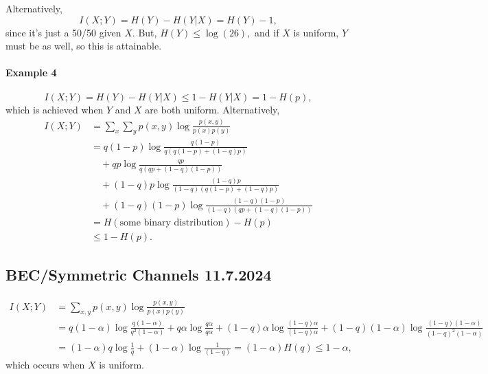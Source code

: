 \documentclass[12pt]{article}
\begin{document}
Alternatively,
\[I(X;Y)=H(Y)-H(Y|X)=H(Y)-1,\]
since it's just a 50/50 given $X.$ But, $H(Y)\le\log(26),$ and if $X$ is uniform, $Y$ must be as well, so this is attainable.

\bigskip
{}

\paragraph{Example 4}
\[I(X;Y)=H(Y)-H(Y|X)\le 1-H(Y|X)=1-H(p),\]
which is achieved when $Y$ and $X$ are both uniform.
Alternatively,
\begin{align*}I(X;Y)&=\sum_x\sum_y p(x,y)\log\frac{p(x,y)}{p(x)p(y)}\\&=q(1-p)\log\frac{q(1-p)}{q(q(1-p)+(1-q)p)}\\&\quad +qp\log\frac{qp}{q(qp+(1-q)(1-p))}\\&\quad +(1-q)p\log\frac{(1-q)p}{(1-q)(q(1-p)+(1-q)p)}\\&\quad +(1-q)(1-p)\log\frac{(1-q)(1-p)}{(1-q)(qp+(1-q)(1-p))}\\&=H(\text{some binary distribution})-H(p)\\&\le \boxed{1-H(p)}.\end{align*}



\subsection{BEC/Symmetric Channels 11.7.2024}


\begin{align*}I(X;Y)&=\sum_{x,y}p(x,y)\log\frac{p(x,y)}{p(x)p(y)}\\&=q(1-\alpha)\log\frac{q(1-\alpha)}{q^2(1-\alpha)}+q\alpha\log\frac{q\alpha}{q\alpha}+(1-q)\alpha\log\frac{(1-q)\alpha}{(1-q)\alpha}+(1-q)(1-\alpha)\log\frac{(1-q)(1-\alpha)}{(1-q)^2(1-\alpha)}\\&=(1-\alpha)q\log\frac{1}{q}+(1-\alpha)\log\frac{1}{(1-q)}=(1-\alpha)H(q)\le 1-\alpha,\end{align*} which occurs when $X$ is uniform. 
\end{document}
